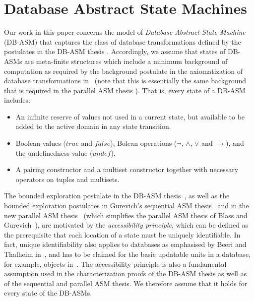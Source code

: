 \documentclass[preprint,11pt]{elsarticle}
\theoremstyle{definition}
\theoremstyle{remark}
\begin{document}
\section{Database Abstract State Machines}\label{sec:adtm}

Our work in this paper concerns the model of \emph{Database Abstract State Machine} (DB-ASM) that captures the class of database transformations defined by the postulates in the DB-ASM thesis \cite{schewe:Axiomatization,DBLP:wangphdbook}. Accordingly, we assume that states of DB-ASMs are meta-finite structures which include a minimum background of computation as required by the background postulate in the axiomatization of database transformations in~\cite{schewe:Axiomatization,DBLP:wangphdbook} (note that this is essentially the same background that is required in the parallel ASM thesis \cite{blass:tocl2003, GurevichParallelCorrection08, FerrarottiSTW16}). That is, every state of a DB-ASM includes:
\begin{itemize} 
\item An infinite reserve of values not used in a current state, but available to be added to the active domain in any state transition.
\item Boolean values ($\mathit{true}$ and $\mathit{false}$), Bolean operations ($\neg$, $\wedge$, $\vee$ and $\rightarrow$), and the undefinedness value ($\textit{undef}$). 
\item A pairing constructor and a multiset constructor together with necessary operators on tuples and multisets. 
\end{itemize}

The bounded exploration postulate in the DB-ASM thesis~\cite{schewe:Axiomatization,DBLP:wangphdbook}, as well as the bounded exploration postulates in Gurevich's sequential ASM thesis~\cite{gurevich:tocl2000} and in the new parallel ASM thesis~\cite{FerrarottiSTW16} (which simplifies the parallel ASM thesis of Blass and Gurevich~\cite{blass:tocl2003, GurevichParallelCorrection08}), are motivated by the \emph{accessibility principle}, which can be defined as the prerequisite that each location of a state must be uniquely identifiable. In fact, unique identifiability also applies to databases as emphasised by Beeri and Thalheim in~\cite{beeri:fomlado1998}, and has to be claimed for the basic updatable units in a database, for example, objects in~\cite{schewe:actacyb1993}. The accessibility principle is also a fundamental assumption used in the characterization proofs of the DB-ASM thesis as well as of the sequential and parallel ASM thesis. We therefore assume that it holds for every state of the DB-ASMs. 
\end{document}
